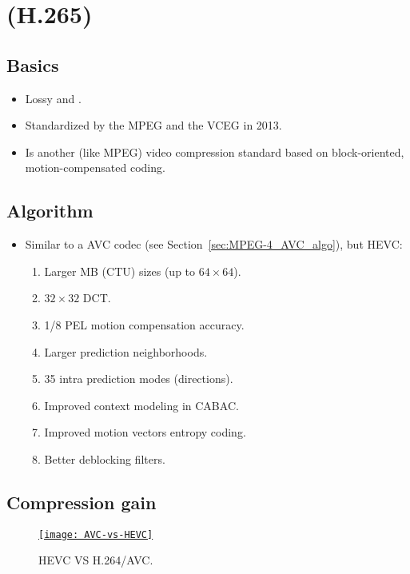 \chapter{ (H.265)}
\label{cha:HEVC}

\section{Basics}
\begin{itemize}
\item Lossy and  \cite{wikipedia_HEVC}.
\item Standardized by the \gls{MPEG} and the \gls{VCEG} in 2013.
\item Is another (like \gls{MPEG}) video compression standard based on
  block-oriented, motion-compensated coding.
\end{itemize}

\section{Algorithm}
\label{sec:HEVC_algo}
\begin{itemize}
\item Similar to a \gls{AVC} codec (see Section~\ref{sec:MPEG-4_AVC_algo}),
  but \gls{HEVC}:
\begin{enumerate}
\item Larger MB (\gls{CTU}) sizes (up to $64\times 64$).
\item $32\times 32$ \gls{DCT}.
\item 1/8 \gls{PEL} motion compensation accuracy.
\item Larger prediction neighborhoods.
\item 35 intra prediction modes (directions).
\item Improved context modeling in \gls{CABAC}.
\item Improved motion vectors entropy coding.
\item Better deblocking filters.
\end{enumerate}
\end{itemize}

\section{Compression gain}

\begin{figure}[H]
  \vspace{+2ex}
  \centering
  \href{https://www.epiphan.com/blog/h264-vs-h265/}{\texttt{[image: AVC-vs-HEVC]}}
  \caption{\gls{HEVC} VS H.264/\gls{AVC}.}
  \label{fig:HEVC_vs_AVC}
\end{figure}

\begin{center}
\end{center}
